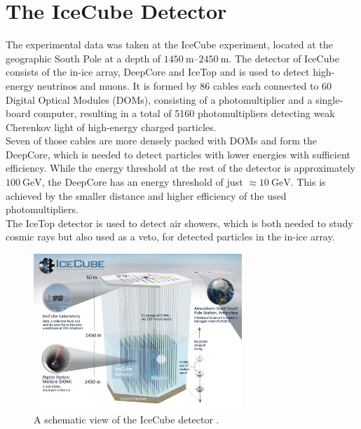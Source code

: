 \section{The IceCube Detector}
\label{sec:Detector}

The experimental data was taken at the IceCube experiment, located at the geographic South Pole at a depth of $\qtyrange{1450}{2450}{\metre}$.
The detector of IceCube consists of the in-ice array, DeepCore and IceTop and is used to detect high-energy neutrinos and muons.
It is formed by
86 cables each connected to 60 Digital Optical Modules (DOMs), consisting of a photomultiplier and a single-board computer, resulting in a total 
of 5160 photomultipliers detecting weak Cherenkov light of high-energy charged particles.\\
Seven of those cables are more densely packed with DOMs and form the DeepCore, which is needed to detect particles with lower energies with sufficient efficiency. While 
the energy threshold at the rest of the detector is approximately $\qty{100}{\giga\electronvolt}$, the DeepCore has an energy threshold of just $\approx \qty{10}{\giga\electronvolt}$.
This is achieved by the smaller distance and higher efficiency of the used photomultipliers.\\
The IceTop detector is used to detect air showers, which is both needed to study cosmic rays but also used as a veto, for detected particles in the in-ice array.
\begin{figure}
    \centering
    \includegraphics[width=0.7\textwidth]{content/pics/icecube_detector.jpg}
    \caption{A schematic view of the IceCube detector \cite{IceCube_pic}.}
    \label{fig:bb_oscillation}
\end{figure}

